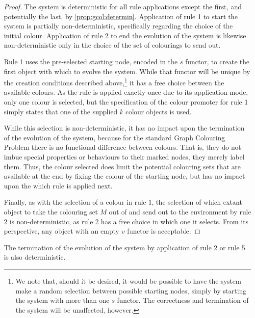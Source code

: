 \begin{proof}
The system is deterministic for all rule applications except the first, and potentially the last, by \cref{prop:gcol:determin}.  Application of rule 1 to start the system is partially non-deterministic, specifically regarding the choice of the initial colour.  Application of rule 2 to end the evolution of the system is likewise non-deterministic only in the choice of the set of colourings to send out.

Rule 1 uses the pre-selected starting node, encoded in the \(s\) functor, to create the first \bo{} object with which to evolve the system.  While that functor will be unique by the creation conditions described above,\footnote{We note that, should it be desired, it would be possible to have the system make a random selection between possible starting nodes, simply by starting the system with more than one \(s\) functor.  The correctness and termination of the system will be unaffected, however.} it has a free choice between the available colours.  As the rule is applied exactly once due to its application mode, only one colour is selected, but the specification of the colour promoter for rule 1 simply states that one of the supplied \(k\) colour objects is used.

While this selection is non-deterministic, it has no impact upon the termination of the evolution of the system, because for the standard Graph Colouring Problem there is no functional difference between colours.  That is, they do not imbue special properties or behaviours to their marked nodes, they merely label them.  Thus, the colour selected does limit the potential colouring sets that are available at the end by fixing the colour of the starting node, but has no impact upon the which rule is applied next.

Finally, as with the selection of a colour in rule 1, the selection of which extant \bo{} object to take the colouring set \(M\) out of and send out to the environment by rule 2 is non-deterministic, as rule 2 has a free choice in which one it selects.  From its perspective, any \bo{} object with an empty \(v\) functor is acceptable.
\end{proof}

\begin{proposition}\label{prop:gcol:ending}
The termination of the evolution of the system by application of rule 2 or rule 5 is also deterministic.
\end{proposition}


